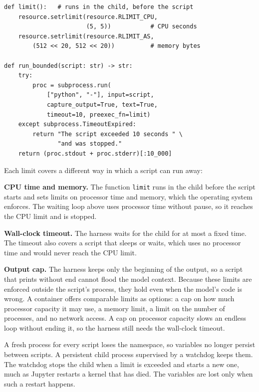 \begin{lstlisting}[basicstyle=\ttfamily\footnotesize, columns=fixed, basewidth=0.525em, caption={Illustrative kernel that runs each script in a child process with resource limits. Imports are omitted.}, label=lst:codeact-limits]
def limit():   # runs in the child, before the script
    resource.setrlimit(resource.RLIMIT_CPU,
                       (5, 5))           # CPU seconds
    resource.setrlimit(resource.RLIMIT_AS,
        (512 << 20, 512 << 20))          # memory bytes

def run_bounded(script: str) -> str:
    try:
        proc = subprocess.run(
            ["python", "-"], input=script,
            capture_output=True, text=True,
            timeout=10, preexec_fn=limit)
    except subprocess.TimeoutExpired:
        return "The script exceeded 10 seconds " \
               "and was stopped."
    return (proc.stdout + proc.stderr)[:10_000]
\end{lstlisting}

Each limit covers a different way in which a script can run away:
\bi
\item \textbf{CPU time and memory.} The function \texttt{limit} runs in the child before the script
starts and sets limits on processor time and memory, which the operating system enforces. The
waiting loop above uses processor time without pause, so it reaches the CPU limit and is stopped.
\item \textbf{Wall-clock timeout.} The harness waits for the child for at most a fixed time. The
timeout also covers a script that sleeps or waits, which uses no processor time and would never
reach the CPU limit.
\item \textbf{Output cap.} The harness keeps only the beginning of the output, so a script that
prints without end cannot flood the model context.
\ei
Because these limits are enforced outside the script's process, they hold even when the model's
code is wrong. A container offers comparable limits as options: a cap on how much processor
capacity it may use, a memory limit, a limit on the number of processes, and no network access. A
cap on processor capacity slows an endless loop without ending it, so the harness still needs the
wall-clock timeout.

A fresh process for every script loses the namespace, so variables no longer persist between
scripts. A persistent child process supervised by a watchdog keeps them. The watchdog stops the
child when a limit is exceeded and starts a new one, much as Jupyter restarts a kernel that has
died. The variables are lost only when such a restart happens.


